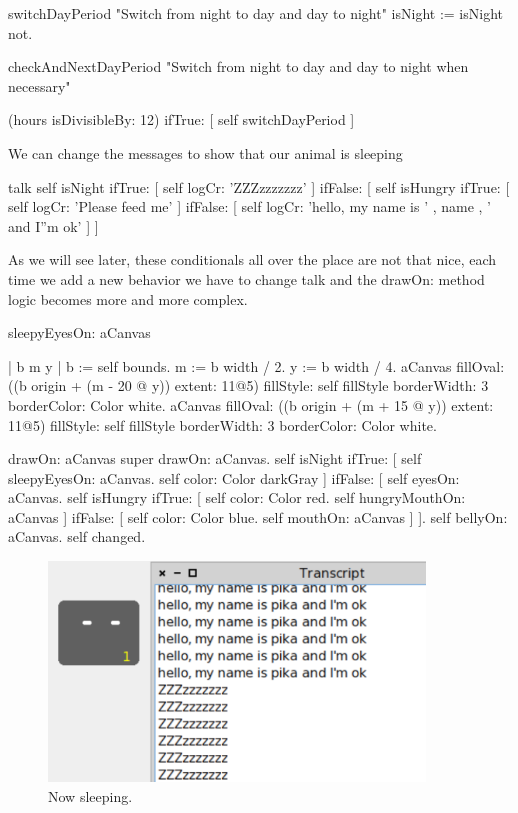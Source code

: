 \documentclass[a4paper,10pt,twoside]{book}
\begin{document}
\begin{code}{}
switchDayPeriod
	"Switch from night to day and day to night"
	isNight := isNight not.
\end{code}

\begin{code}{}
checkAndNextDayPeriod
	"Switch from night to day and day to night when necessary" 

	(hours isDivisibleBy: 12)
		ifTrue: [ self switchDayPeriod ]
\end{code}


We can change the messages to show that our animal is sleeping

\begin{code}{}
talk
	self isNight
		ifTrue: [ self logCr: 'ZZZzzzzzzz' ]
		ifFalse: [ 
			self isHungry
				ifTrue: [ self logCr: 'Please feed me' ]
				ifFalse: [ self logCr: 'hello, my name is ' , name , ' and I''m ok' ] ]
\end{code}

As we will see later, these conditionals all over the place are not that nice, each time we
add a new behavior we have to change talk and the drawOn: method logic becomes more and more complex. 

\begin{code}{}
sleepyEyesOn: aCanvas

	| b m y |
	b := self bounds.
	m := b width / 2.
	y := b width / 4.
	aCanvas 
			fillOval: ((b origin   + (m - 20 @ y)) extent: 11@5)
			fillStyle: self fillStyle 
			borderWidth: 3
			borderColor: Color white.
	aCanvas 
			fillOval: ((b origin   + (m + 15 @ y)) extent: 11@5)
			fillStyle: self fillStyle 
			borderWidth: 3
			borderColor: Color white.
\end{code}

\begin{code}{}
drawOn: aCanvas
	super drawOn: aCanvas.
	self isNight
		ifTrue: [ 
				self sleepyEyesOn: aCanvas.
				self color: Color darkGray ]
		ifFalse: [ 
			self eyesOn: aCanvas.
			self isHungry
				ifTrue: [ 
					self color: Color red.
					self hungryMouthOn: aCanvas ]
				ifFalse: [ 
					self color: Color blue.
					self mouthOn: aCanvas ] ].
	self bellyOn: aCanvas.
	self changed.
\end{code}


\begin{figure}
\begin{center}
\includegraphics[width=10cm]{figures/sleeping}
\caption{Now sleeping.}
\end{center}
\end{figure}
\end{document}
